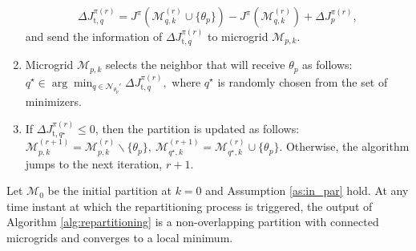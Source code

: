 \begin{alg}
\begin{enumerate}
\begin{equation}
		\Delta J^{\pi(r)}_{\mathrm{t},q} = J^{\pi}(\mathcal{M}_{q,k}^{(r)}\cup\{\theta_p \}) - J^{\pi}(\mathcal{M}_{q,k}^{(r)})+\Delta J^{\pi(r)}_p,
		\label{eq:delta_Jq}
		\end{equation}
		and send the information of $\Delta J^{\pi(r)}_{\mathrm{t},q}$ to microgrid $\mathcal{M}_{p,k}$.
		\item Microgrid $\mathcal{M}_{p,k}$ selects the neighbor that will receive $\theta_p$ as follows:
		$q^{\star} \in \arg\min_{q \in \mathcal{N}_{\theta_p}'}\Delta J^{\pi(r)}_{\mathrm{t},q},
		$%
		where $q^{\star}$ is randomly chosen from the set of minimizers.
		\item  If $\Delta J^{\pi(r)}_{\mathrm{t},q^{\star}} \leq 0$, then the partition is updated as follows:
		$\mathcal{M}_{p,k}^{(r+1)} = \mathcal{M}_{p,k}^{(r)}\backslash \{\theta_p\},\
		\mathcal{M}_{q^{\star},k}^{(r+1)} = \mathcal{M}_{q^{\star},k}^{(r)}\cup \{\theta_p\}.
		$ %
		Otherwise, the algorithm jumps to the next iteration, $r+1$. \eod
	\end{enumerate}
\end{alg}


\begin{prop}
	\label{prop:sol_alg}
	Let $\boldsymbol{\mathcal{M}}_0$ be the initial partition at $k=0$ and Assumption \ref{as:in_par} hold. At any time instant at which the repartitioning process is triggered, the output of Algorithm \ref{alg:repartitioning} is a non-overlapping partition with connected microgrids and converges to a local minimum. \eod 
\end{prop}



